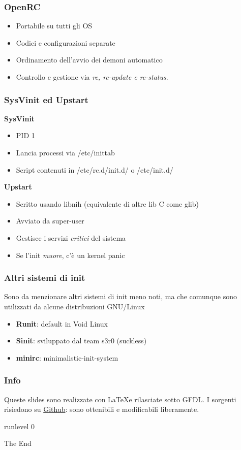 \documentclass{beamer}
\begin{document}

\begin{frame}
	\frametitle{OpenRC}
	\begin{itemize}
		\item Portabile su tutti gli OS
		\item Codici e configurazioni separate
		\item Ordinamento dell'avvio dei demoni automatico
		\item Controllo e gestione via \textit{rc, rc-update e rc-status}. 
	\end{itemize}	 
\end{frame}

\begin{frame}
	\frametitle{SysVinit ed Upstart}
	\textbf{SysVinit}
	\begin{itemize}
		\item PID 1
		\item Lancia processi via /etc/inittab
		\item Script contenuti in /etc/rc.d/init.d/ o /etc/init.d/
	\end{itemize}	
\textbf{Upstart}
\begin{itemize}
	\item Scritto usando libnih (equivalente di altre lib C come glib)
	\item Avviato da super-user
	\item Gestisce i servizi \textit{critici} del sistema
	\item Se l'init \textit{muore}, c'\`e un kernel panic
\end{itemize}
\end{frame}

\begin{frame}
	\frametitle{Altri sistemi di init}
	Sono da menzionare altri sistemi di init meno noti, ma che comunque sono utilizzati da alcune distribuzioni GNU/Linux
	\begin{itemize}
		\item \textbf{Runit}: default in Void Linux
		\item \textbf{Sinit}: sviluppato dal team s3r0 (suckless)
		\item \textbf{minirc}: minimalistic-init-system
	\end{itemize}
\end{frame}
\begin{frame}
	\frametitle{Info}
	Queste slides sono realizzate con \LaTeX  e rilasciate sotto GFDL.
	I sorgenti risiedono su \href{https://github.com/smlb/LinuxDay2014-smlb}{Github}: sono ottenibili e modificabili liberamente.
\end{frame}
\begin{frame}
\Huge{\centerline{runlevel 0}}
\huge{\centerline{The End}}
\end{frame}

\end{document}

